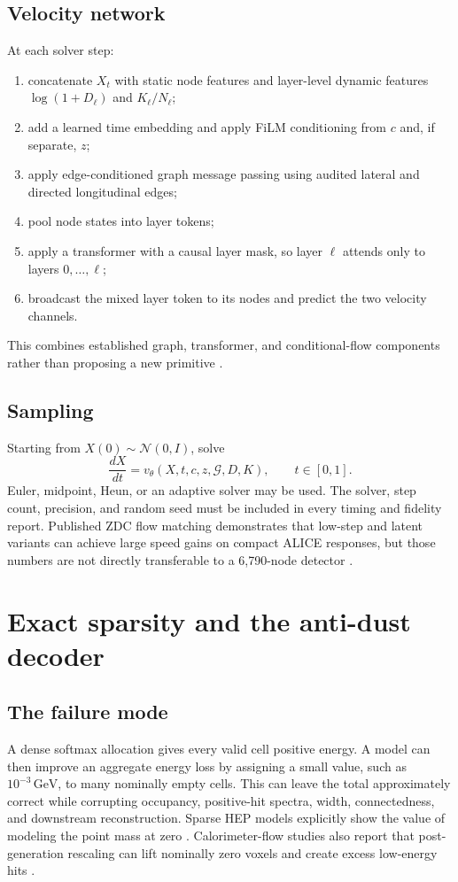 \documentclass[11pt]{article}
\theoremstyle{definition}
\theoremstyle{remark}
\newcommand{\G}{\mathcal{G}}
\newcommand{\GeV}{\,\mathrm{GeV}}
\begin{document}
\subsection{Velocity network}
At each solver step:
\begin{enumerate}[leftmargin=2em]
  \item concatenate $X_t$ with static node features and layer-level dynamic features $\log(1+D_\ell)$ and $K_\ell/N_\ell$;
  \item add a learned time embedding and apply FiLM conditioning from $c$ and, if separate, $z$;
  \item apply edge-conditioned graph message passing using audited lateral and directed longitudinal edges;
  \item pool node states into layer tokens;
  \item apply a transformer with a causal layer mask, so layer $\ell$ attends only to layers $0,\ldots,\ell$;
  \item broadcast the mixed layer token to its nodes and predict the two velocity channels.
\end{enumerate}
This combines established graph, transformer, and conditional-flow components rather than proposing a new primitive \citep{calograph,calodream,calodiffusion}.

\subsection{Sampling}
Starting from $X(0)\sim\mathcal N(0,I)$, solve
\begin{equation}
  \frac{dX}{dt}=v_\theta(X,t,c,z,\G,D,K),\qquad t\in[0,1].
\end{equation}
Euler, midpoint, Heun, or an adaptive solver may be used. The solver, step count, precision, and random seed must be included in every timing and fidelity report. Published ZDC flow matching demonstrates that low-step and latent variants can achieve large speed gains on compact ALICE responses, but those numbers are not directly transferable to a 6,790-node detector \citep{fasterzdc,fasterzdc_code}.

\section{Exact sparsity and the anti-dust decoder}

\subsection{The failure mode}
A dense softmax allocation gives every valid cell positive energy. A model can then improve an aggregate energy loss by assigning a small value, such as $10^{-3}\GeV$, to many nominally empty cells. This can leave the total approximately correct while corrupting occupancy, positive-hit spectra, width, connectedness, and downstream reconstruction. Sparse HEP models explicitly show the value of modeling the point mass at zero \citep{sarm,calopointflow,caloclouds}. Calorimeter-flow studies also report that post-generation rescaling can lift nominally zero voxels and create excess low-energy hits \citep{icaloflow,convl2lflows}.
\end{document}
